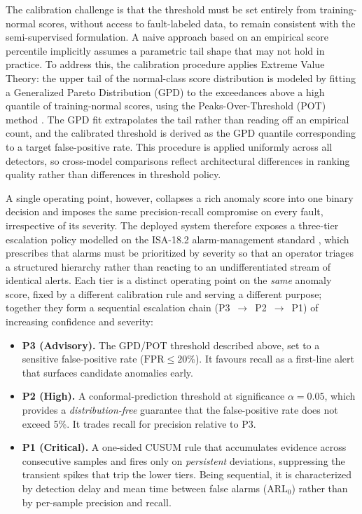 The calibration challenge is that the threshold must be set entirely from training-normal scores, without access to fault-labeled data, to remain consistent with the semi-supervised formulation. A naive approach based on an empirical score percentile implicitly assumes a parametric tail shape that may not hold in practice. To address this, the calibration procedure applies Extreme Value Theory: the upper tail of the normal-class score distribution is modeled by fitting a Generalized Pareto Distribution (GPD) to the exceedances above a high quantile of training-normal scores, using the Peaks-Over-Threshold (POT) method \citep{pickands1975statistical, coles2001extreme}. The GPD fit extrapolates the tail rather than reading off an empirical count, and the calibrated threshold is derived as the GPD quantile corresponding to a target false-positive rate. This procedure is applied uniformly across all detectors, so cross-model comparisons reflect architectural differences in ranking quality rather than differences in threshold policy.

A single operating point, however, collapses a rich anomaly score into one binary decision and imposes the same precision-recall compromise on every fault, irrespective of its severity. The deployed system therefore exposes a three-tier escalation policy modelled on the ISA-18.2 alarm-management standard \citep{isa182011alarm}, which prescribes that alarms must be prioritized by severity so that an operator triages a structured hierarchy rather than reacting to an undifferentiated stream of identical alerts. Each tier is a distinct operating point on the \emph{same} anomaly score, fixed by a different calibration rule and serving a different purpose; together they form a sequential escalation chain (P3~$\rightarrow$~P2~$\rightarrow$~P1) of increasing confidence and severity:

\begin{itemize}
    \item \textbf{P3 (Advisory).} The GPD/POT threshold described above, set to a sensitive false-positive rate ($\text{FPR} \leq 20\%$). It favours recall as a first-line alert that surfaces candidate anomalies early.
    \item \textbf{P2 (High).} A conformal-prediction threshold \citep{vovk2005algorithmic} at significance $\alpha = 0.05$, which provides a \emph{distribution-free} guarantee that the false-positive rate does not exceed 5\%. It trades recall for precision relative to P3.
    \item \textbf{P1 (Critical).} A one-sided CUSUM rule \citep{page1954continuous} that accumulates evidence across consecutive samples and fires only on \emph{persistent} deviations, suppressing the transient spikes that trip the lower tiers. Being sequential, it is characterized by detection delay and mean time between false alarms ($\text{ARL}_0$) rather than by per-sample precision and recall.
\end{itemize}

